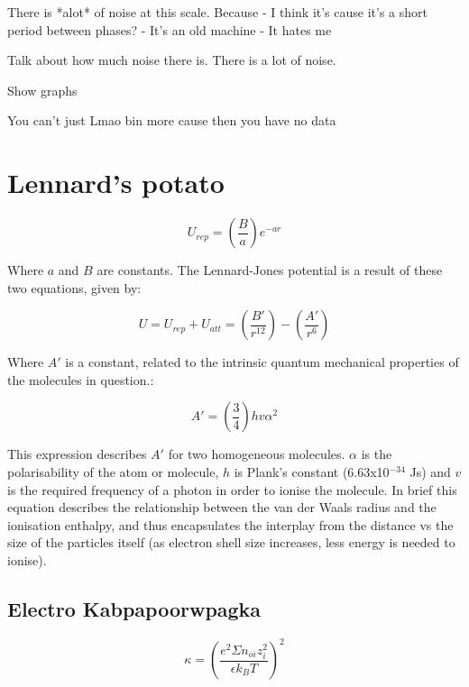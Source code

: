 There is *alot* of noise at this scale. Because 
- I think it's cause it's a short period between phases?
- It's an old machine
- It hates me

Talk about how much noise there is. There is a lot of noise.

Show graphs

You can't just Lmao bin more cause then you have no data

\section{Lennard's potato}

\begin{equation} %
U_{rep} = \left(\frac{B}{a}\right) e^{-ar}
\end{equation}

Where $a$ and $B$ are constants. The Lennard-Jones potential is a result of these two equations, given by:

\begin{equation} %
U = U_{rep} + U_{att} = \left( \frac{B'}{r^{12}} \right) - \left( \frac{A'}{r^6}\right)
\end{equation}

Where $A'$ is a constant, related to the intrinsic quantum mechanical properties of the molecules in question.\cite{London}:

\begin{equation} %
A' = \left( \frac{3}{4} \right) h v \alpha^2
\end{equation}
%


This expression describes $A'$ for two homogeneous molecules. $\alpha$ is the polarisability of the atom or molecule, $h$ is Plank's constant (6.63x10$^{-34}$ Js) and $v$ is the required frequency of a photon in order to ionise the molecule. In brief this equation describes the relationship between the van der Waals radius and the ionisation enthalpy, and thus encapsulates the interplay from the distance vs the size of the particles itself (as electron shell size increases, less energy is needed to ionise).

\subsection{Electro Kabpapoorwpagka}
\begin{equation} %
\kappa = \left(\frac{e^2\Sigma n_{oi} z^2_i}{\epsilon k_B T}\right)^2 
\end{equation}

